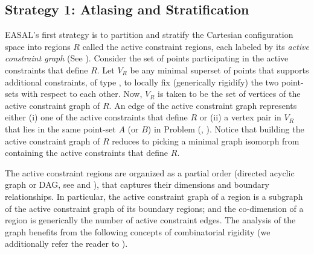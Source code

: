 
\subsection{Strategy 1: Atlasing and Stratification}
\label{sec:stratification}

EASAL's first strategy is to partition and stratify the Cartesian configuration
space into regions $R$ called the active constraint regions, each labeled by
its \emph{active constraint graph} (See ).  Consider the set
of points participating in the active constraints that define $R$. Let $V_R$ be
any minimal superset of points that supports additional constraints, of type
\ctwo, to locally fix (generically rigidify) the two point-sets with respect to
each other.  Now, $V_R$ is taken to be the set of vertices of the active
constraint graph of $R$. An edge of the active constraint graph represents
either (i) one of the active constraints that define $R$ or (ii) a vertex pair
in $V_R$ that lies in the same point-set $A$ (or $B$) in Problem (\cone, \ctwo). Notice that building the active
constraint graph of $R$ reduces to picking a minimal graph isomorph from
 containing the active constraints that define $R$.

The active constraint regions are organized as a partial order (directed
acyclic graph or DAG, see  and
), that captures their dimensions and boundary
relationships. In particular, the active constraint graph of a region is a
subgraph of the active constraint graph of its boundary regions; and the
co-dimension of a region is generically the number of active constraint edges.
The analysis of the graph benefits from the following concepts of combinatorial
rigidity (we additionally refer the reader to \cite{CombinatorialRigidity}).

